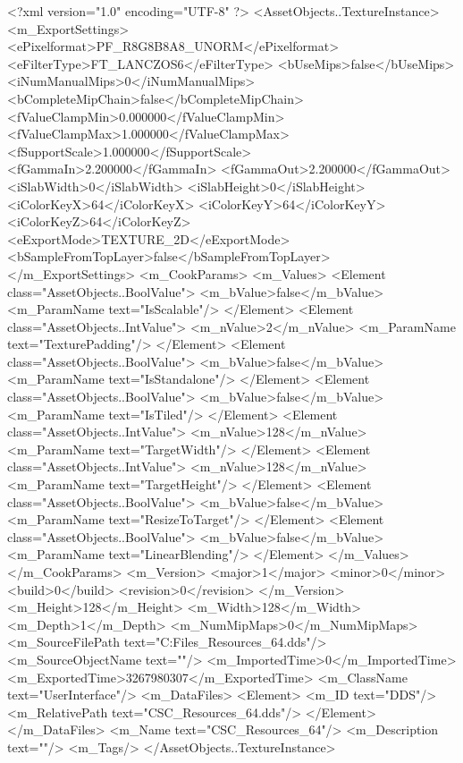 <?xml version="1.0" encoding="UTF-8" ?>
<AssetObjects..TextureInstance>
	<m_ExportSettings>
		<ePixelformat>PF_R8G8B8A8_UNORM</ePixelformat>
		<eFilterType>FT_LANCZOS6</eFilterType>
		<bUseMips>false</bUseMips>
		<iNumManualMips>0</iNumManualMips>
		<bCompleteMipChain>false</bCompleteMipChain>
		<fValueClampMin>0.000000</fValueClampMin>
		<fValueClampMax>1.000000</fValueClampMax>
		<fSupportScale>1.000000</fSupportScale>
		<fGammaIn>2.200000</fGammaIn>
		<fGammaOut>2.200000</fGammaOut>
		<iSlabWidth>0</iSlabWidth>
		<iSlabHeight>0</iSlabHeight>
		<iColorKeyX>64</iColorKeyX>
		<iColorKeyY>64</iColorKeyY>
		<iColorKeyZ>64</iColorKeyZ>
		<eExportMode>TEXTURE_2D</eExportMode>
		<bSampleFromTopLayer>false</bSampleFromTopLayer>
	</m_ExportSettings>
	<m_CookParams>
		<m_Values>
			<Element class="AssetObjects..BoolValue">
				<m_bValue>false</m_bValue>
				<m_ParamName text="IsScalable"/>
			</Element>
			<Element class="AssetObjects..IntValue">
				<m_nValue>2</m_nValue>
				<m_ParamName text="TexturePadding"/>
			</Element>
			<Element class="AssetObjects..BoolValue">
				<m_bValue>false</m_bValue>
				<m_ParamName text="IsStandalone"/>
			</Element>
			<Element class="AssetObjects..BoolValue">
				<m_bValue>false</m_bValue>
				<m_ParamName text="IsTiled"/>
			</Element>
			<Element class="AssetObjects..IntValue">
				<m_nValue>128</m_nValue>
				<m_ParamName text="TargetWidth"/>
			</Element>
			<Element class="AssetObjects..IntValue">
				<m_nValue>128</m_nValue>
				<m_ParamName text="TargetHeight"/>
			</Element>
			<Element class="AssetObjects..BoolValue">
				<m_bValue>false</m_bValue>
				<m_ParamName text="ResizeToTarget"/>
			</Element>
			<Element class="AssetObjects..BoolValue">
				<m_bValue>false</m_bValue>
				<m_ParamName text="LinearBlending"/>
			</Element>
		</m_Values>
	</m_CookParams>
	<m_Version>
		<major>1</major>
		<minor>0</minor>
		<build>0</build>
		<revision>0</revision>
	</m_Version>
	<m_Height>128</m_Height>
	<m_Width>128</m_Width>
	<m_Depth>1</m_Depth>
	<m_NumMipMaps>0</m_NumMipMaps>
	<m_SourceFilePath text="C:\Users\Shadow\Desktop\Working Files\Icons\Resources\CSC_Resources_64.dds"/>
	<m_SourceObjectName text=""/>
	<m_ImportedTime>0</m_ImportedTime>
	<m_ExportedTime>3267980307</m_ExportedTime>
	<m_ClassName text="UserInterface"/>
	<m_DataFiles>
		<Element>
			<m_ID text="DDS"/>
			<m_RelativePath text="CSC_Resources_64.dds"/>
		</Element>
	</m_DataFiles>
	<m_Name text="CSC_Resources_64"/>
	<m_Description text=""/>
	<m_Tags/>
</AssetObjects..TextureInstance>

